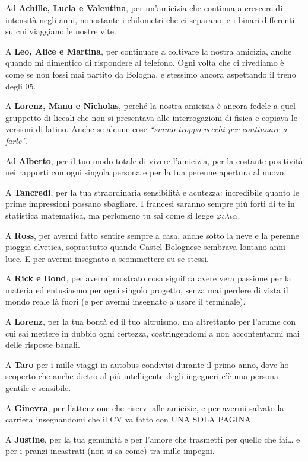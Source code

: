 {Ad \textbf{Achille, Lucia e Valentina}, per un’amicizia che continua a crescere di intensità negli anni, nonostante i chilometri che ci separano, e i binari differenti su cui viaggiano le nostre vite.

A \textbf{Leo, Alice e Martina}, per continuare a coltivare la nostra amicizia, anche quando mi dimentico di rispondere al telefono. Ogni volta che ci rivediamo è come se non fossi mai partito da Bologna, e stessimo ancora aspettando il treno degli 05.

A \textbf{Lorenz, Manu e Nicholas}, perché la nostra amicizia è ancora fedele a quel gruppetto di liceali che non si presentava alle interrogazioni di fisica e copiava le versioni di latino. Anche se alcune cose \textit{``siamo troppo vecchi per continuare a farle''}.

Ad \textbf{Alberto}, per il tuo modo totale di vivere l’amicizia, per la costante positività nei rapporti con ogni singola persona e per la tua perenne apertura al nuovo.

A \textbf{Tancredi}, per la tua straordinaria sensibilità e acutezza: incredibile quanto le prime impressioni possano sbagliare. I francesi saranno sempre più forti di te in statistica matematica, ma perlomeno tu sai come si legge $\varphi\iota\lambda\iota\alpha$.

A \textbf{Ross}, per avermi fatto sentire sempre a casa, anche sotto la neve e la perenne pioggia elvetica, soprattutto quando Castel Bolognese sembrava lontano anni luce. E per avermi insegnato a scommettere su se stessi.

A \textbf{Rick e Bond}, per avermi mostrato cosa significa avere vera passione per la materia ed entusiasmo per ogni singolo progetto, senza mai perdere di vista il mondo reale là fuori (e per avermi insegnato a usare il terminale).

A \textbf{Lorenz}, per la tua bontà ed il tuo altruismo, ma altrettanto per l’acume con cui sai mettere in dubbio ogni certezza, costringendomi a non accontentarmi mai delle risposte banali.

A \textbf{Taro} per i mille viaggi in autobus condivisi durante il primo anno, dove ho scoperto che anche dietro al più intelligente degli ingegneri c’è una persona gentile e sensibile.

A \textbf{Ginevra}, per l’attenzione che riservi alle amicizie, e per avermi salvato la carriera insegnandomi che il CV va fatto con UNA SOLA PAGINA.

A \textbf{Justine}, per la tua genuinità e per l’amore che trasmetti per quello che fai… e per i pranzi incastrati (non si sa come) tra mille impegni.

}
